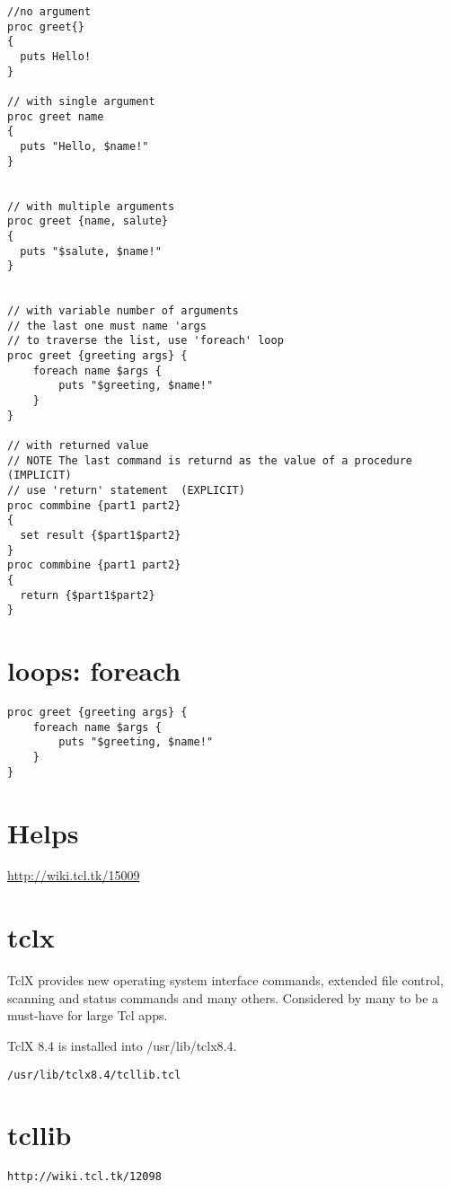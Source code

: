 \begin{verbatim}
//no argument
proc greet{}
{
  puts Hello!
}

// with single argument
proc greet name
{
  puts "Hello, $name!"
}


// with multiple arguments
proc greet {name, salute}
{
  puts "$salute, $name!"
}


// with variable number of arguments
// the last one must name 'args
// to traverse the list, use 'foreach' loop
proc greet {greeting args} {
    foreach name $args {
        puts "$greeting, $name!"
    }
}

// with returned value
// NOTE The last command is returnd as the value of a procedure (IMPLICIT)
// use 'return' statement  (EXPLICIT)
proc commbine {part1 part2}
{
  set result {$part1$part2} 
}
proc commbine {part1 part2}
{
  return {$part1$part2} 
}
\end{verbatim}

\section{loops: foreach}
\label{sec:tcl-foreach}
\label{sec:tcl-loop-foreach}

\begin{verbatim}
proc greet {greeting args} {
    foreach name $args {
        puts "$greeting, $name!"
    }
}
\end{verbatim}



\section{Helps}


\url{http://wiki.tcl.tk/15009}


\section{tclx}
\label{sec:tclx}

\begin{framed}
TclX provides new operating system interface commands, extended file control,
scanning and status commands and many others. Considered by many to be a
must-have for large Tcl apps. 

TclX 8.4 is installed into /usr/lib/tclx8.4.
\end{framed}

\begin{verbatim}
/usr/lib/tclx8.4/tcllib.tcl
\end{verbatim}

\section{tcllib}
\label{sec:tcllib}

\begin{verbatim}
http://wiki.tcl.tk/12098
\end{verbatim}

